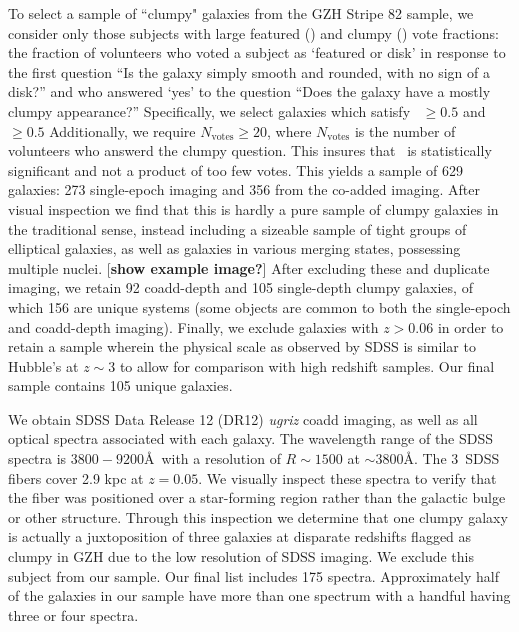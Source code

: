 To select a sample of ``clumpy" galaxies from the GZH Stripe 82 sample, we consider only those subjects with large featured (\ffeat) and clumpy (\fclump) vote fractions: the fraction of volunteers who voted a subject as `featured or disk' in response to the first question ``Is the galaxy simply smooth and rounded, with no sign of a disk?'' and who answered `yes' to the question ``Does the galaxy have a mostly clumpy appearance?'' Specifically, we select galaxies which satisfy \ffeat~$\ge0.5$ and \fclump~$\ge0.5$ Additionally, we require $N_{\mathrm{votes}} \ge 20$, where $N_{\mathrm{votes}}$ is the number of volunteers who answerd the clumpy question. This insures that \fclump~is statistically significant and not a product of too few votes.  This yields a sample of 629 galaxies: 273 single-epoch imaging and 356 from the co-added imaging. After visual inspection we find that this is hardly a pure sample of clumpy galaxies in the traditional sense, instead including a sizeable sample of tight groups of elliptical galaxies, as well as galaxies in various merging states, possessing multiple nuclei. [\textbf{show example image?}] After excluding these and duplicate imaging, we retain 92 coadd-depth and 105 single-depth clumpy galaxies, of which 156 are unique systems (some objects are common to both the single-epoch and coadd-depth imaging). Finally, we exclude galaxies with $z>0.06$ in order to retain a sample wherein the physical scale as observed by SDSS is similar to Hubble's at $z\sim3$ to allow for comparison with high redshift samples. Our final sample contains 105 unique galaxies. 


We obtain SDSS Data Release 12 (DR12) \textit{ugriz} coadd imaging, as well as all optical spectra associated with each galaxy. The wavelength range of the SDSS spectra is $3800-9200$\AA~with a resolution of $R\sim 1500$ at $\sim3800$\AA. The $3$\arcsec~SDSS fibers cover 2.9 kpc at $z=0.05$. We visually inspect these spectra to verify that the fiber was positioned over a star-forming region rather than the galactic bulge or other structure. Through this inspection we determine that one clumpy galaxy is actually a juxtoposition of three galaxies at disparate redshifts flagged as clumpy in GZH due to the low resolution of SDSS imaging. We exclude this subject from our sample. Our final list includes 175 spectra. Approximately half of the galaxies in our sample have more than one spectrum with a handful having three or four spectra.  
 


